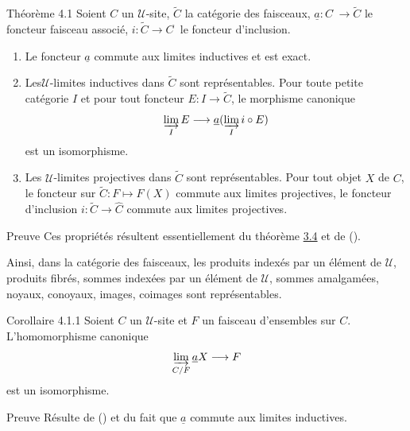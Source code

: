 \begin{enonce*}{Théorème 4.1}
Soient $C$ un $𝒰$-site, $\widetilde{C}$ la catégorie des
faisceaux, $\underline{a}:C^{\widehat{\phantom{,}}}\rightarrow
\widetilde{C}$ le foncteur faisceau associé,
$i:\widetilde{C}\rightarrow C^{\widehat{\phantom{,}}}$ le foncteur
d'inclusion.
\begin{enumerate}
\renewcommand{\labelenumi}{\theenumi)}
\item Le foncteur $\underline{a}$ commute aux limites inductives et est exact.

\item Les\pageoriginale $𝒰$-limites inductives dans
$\widetilde{C}$ sont
  représentables. Pour toute petite catégorie $I$ et pour tout
  foncteur $E:I\rightarrow \widetilde{C}$, le morphisme canonique
$$
\varinjlim_I E\longrightarrow \underline{a}(\varinjlim_I i\circ E)
$$
est un isomorphisme.

\item Les $𝒰$-limites projectives dans $\widetilde{C}$ sont
  représentables. Pour tout objet $X$ de $C$, le foncteur sur
  $\widetilde{C}:F\mapsto F(X)$ commute aux limites projectives, \ie
  le foncteur d'inclusion $i:\widetilde{C}\rightarrow \widehat{C}$
  commute aux limites projectives.
\end{enumerate}
\end{enonce*}

\begin{enonce*}[remark]{Preuve}
Ces propriétés résultent essentiellement du théorème
\hyperref[II.theo3.4]{3.4} et de ().
\end{enonce*}

Ainsi, dans la catégorie des faisceaux, les produits indexés par
un élément de $𝒰$, produits fibrés, sommes indexées
par un élément de $𝒰$, sommes amalgamées, noyaux,
conoyaux, images, coimages sont représentables.

\begin{enonce*}{Corollaire 4.1.1}
Soient $C$ un $𝒰$-site et $F$ un faisceau d'ensembles sur
$C$. L'homomorphisme canonique
$$
\varinjlim_{C/F} \underline{a}X\longrightarrow F
$$
est un isomorphisme.
\end{enonce*}

\begin{enonce*}[remark]{Preuve}
Résulte de () et du fait que $\underline{a}$ commute
aux limites inductives.
\end{enonce*}

